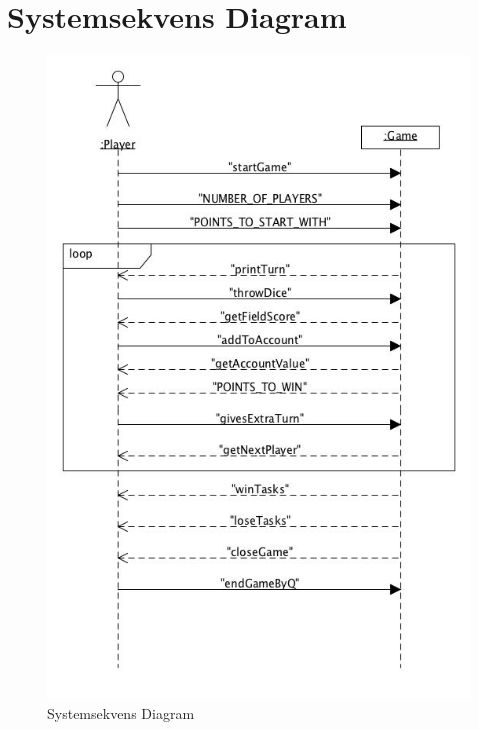 \section{Systemsekvens Diagram}
\begin{figure}[!ht]
\centering
\includegraphics[scale=0.4]{SystemSequenceDiagramDieGame.jpg}
\caption[<Text for the list of figures>]{Systemsekvens Diagram}
\label{fig:figure 2} 
\end{figure}
